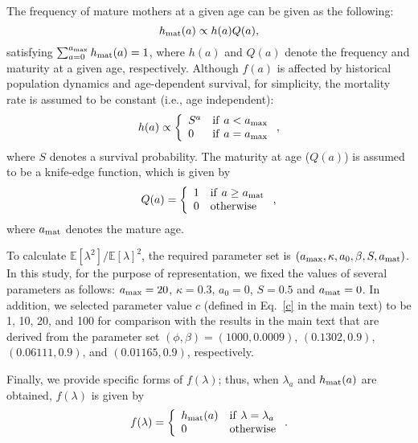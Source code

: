 \documentclass[12pt, English]{article}
\begin{document}
\begin{spacing}{1.9}
The frequency of mature mothers at a given age can be given as the following: 
\begin{equation}
h_{\rm mat}(a) \propto h(a)Q(a),
\label{freq}
\end{equation}
satisfying $\sum_{a=0}^{a_{\rm max}}h_{\rm mat}(a)=1$, where $h(a)$ and $Q(a)$ denote the frequency and maturity at a given age, respectively. Although $f(a)$ is affected by historical population dynamics and age-dependent survival, for simplicity, the mortality rate is assumed to be constant (i.e., age independent):
\begin{equation}
	h(a)\propto
	\left \{
	\begin{array}{l}
		S^{a}\\
		0
	\end{array}
	\begin{array}{l}
		{\rm if}\ a < a_{\rm max}\\
		{\rm if}\ a = a_{\rm max}
	\end{array}
	\right.
	,
	\label{survival}
\end{equation}
where $S$ denotes a survival probability. The maturity at age ($Q(a)$) is assumed to be a knife-edge function, which is given by
\begin{equation}
	Q(a)=
	\left \{
	\begin{array}{l}
		1\\
		0
	\end{array}
	\begin{array}{l}
		{\rm if}\ a\geq a_{\rm mat}\\
		{\rm otherwise }
	\end{array}
	\right.
	,
	\label{Q}
\end{equation}
where $a_{\rm mat}$ denotes the mature age. 

To calculate $\mathbb{E}[\lambda^2] / \mathbb{E}[\lambda]^2$, the required parameter set is $(a_{\rm max}, \kappa, a_0, \beta, S, a_{\rm mat})$. In this study, for the purpose of representation, we fixed the values of several parameters as follows: $a_{\rm max}=20$, $\kappa=0.3$, $a_0=0$, $S=0.5$ and $a_{\rm mat}=0$. In addition, we selected parameter value $c$ (defined in Eq.~\ref{c} in the main text) to be 1, 10, 20, and 100 for comparison with the results in the main text that are derived from the parameter set $(\phi, \beta)=(1000,0.0009)$, $(0.1302,0.9)$, $(0.06111,0.9)$, and $(0.01165,0.9)$, respectively. 

Finally, we provide specific forms of $f(\lambda)$; thus, when $\lambda_a$ and $h_{\rm mat}(a)$ are obtained, $f(\lambda)$ is given by
\begin{equation}
	f(\lambda) =
	\left \{
	\begin{array}{l}
		h_{\rm mat}(a)\\
		0
	\end{array}
	\begin{array}{l}
		{\rm if}\ \lambda = \lambda_a\\
		{\rm otherwise }
	\end{array}
	\right.
	.
	\label{f_lambda}
\end{equation}


\end{spacing}
\end{document}
